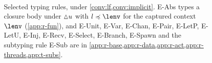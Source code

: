 \begin{figure}[tbp]
\begin{rules}
{        \\ }
      {\eff{\varepsilon}}
    \label{rule:E-Link}
  \end{rules}
  \figrule
  \caption{Selected typing rules, under \cref{conv:lf,conv:implicit}. E-Abs types a closure body under ${\vartriangle}u$ with $l \preccurlyeq \lenv$ for the captured context $\lenv$ (\cref{app:r-fun}), and E-Unit, E-Var, E-Chan, E-Pair, E-LetP, E-LetU, E-Inj, E-Recv, E-Select, E-Branch, E-Spawn and the subtyping rule E-Sub are in \cref{app:r-base,app:r-data,app:r-act,app:r-threads,app:t-subs}.}
  \label{fig:typing-core}
\end{figure}
